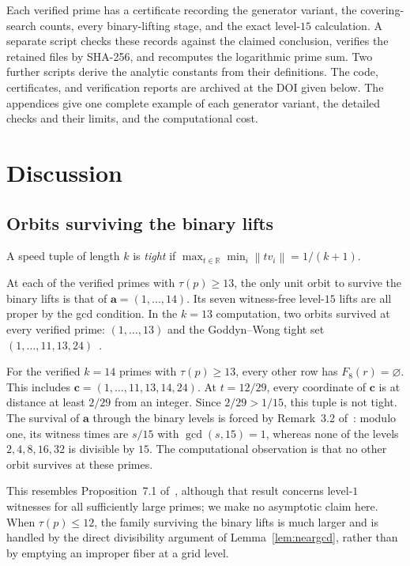 \documentclass[11pt]{article}
\theoremstyle{definition}
\theoremstyle{remark}
\newcommand{\R}{\mathbb{R}}
\newcommand{\vct}[1]{\mathbf{#1}}
\newcommand{\nearest}[1]{\left\lVert #1\right\rVert}
\begin{document}
Each verified prime has a certificate recording the generator variant,
the covering-search counts, every binary-lifting stage, and the exact
level-$15$ calculation.  A separate script checks these records against
the claimed conclusion, verifies the retained files by SHA-256, and
recomputes the logarithmic prime sum.  Two further scripts derive the
analytic constants from their definitions.  The code, certificates, and
verification reports are archived at the DOI given below.  The appendices
give one complete example of each generator variant, the detailed checks
and their limits, and the computational cost.

\section{Discussion}\label{sec:universality}

\subsection{Orbits surviving the binary lifts}

A speed tuple of length $k$ is \emph{tight} if
$\max_{t\in\R}\min_i\nearest{t v_i}=1/(k+1)$.

At each of the \NoNearGcdCount{} verified primes with $\tau(p)\geq13$, the
only unit orbit to survive the binary lifts is that of
$\vct{a}=(1,\ldots,14)$.  Its seven witness-free level-$15$ lifts are all
proper by the gcd condition.  In the $k=13$ computation, two orbits survived
at every verified prime: $(1,\ldots,13)$ and the Goddyn--Wong tight set
$(1,\ldots,11,13,24)$~\cite{GW06,Allikvere26}.

For the verified $k=14$ primes with $\tau(p)\geq13$, every other row has
$F_8(r)=\varnothing$.  This includes
$\vct{c}=(1,\ldots,11,13,14,24)$.  At $t=12/29$, every coordinate of
$\vct{c}$ is at distance at least $2/29$ from an integer.  Since
$2/29>1/15$, this tuple is not tight.  The survival of $\vct{a}$ through
the binary levels is forced by Remark~3.2 of~\cite{ST26}: modulo one, its
witness times are $s/15$ with $\gcd(s,15)=1$, whereas none of the levels
$2,4,8,16,32$ is divisible by $15$.  The computational observation is
that no other orbit survives at these primes.

This resembles Proposition~7.1 of~\cite{ST26}, although that result
concerns level-$1$ witnesses for all sufficiently large primes; we make no
asymptotic claim here.  When $\tau(p)\leq12$, the family surviving the
binary lifts is much larger and is handled by the direct divisibility
argument of Lemma~\ref{lem:neargcd}, rather than by emptying an improper
fiber at a grid level.
\end{document}
